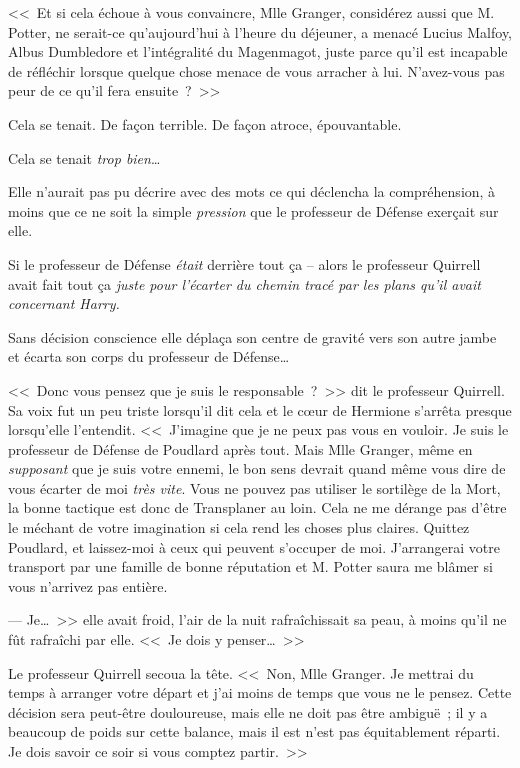 <<~Et si cela échoue à vous convaincre, Mlle Granger, considérez aussi que M. Potter, ne serait-ce qu'aujourd'hui à l'heure du déjeuner, a menacé Lucius Malfoy, Albus Dumbledore et l'intégralité du Magenmagot, juste parce qu'il est incapable de réfléchir lorsque quelque chose menace de vous arracher à lui. N'avez-vous pas peur de ce qu'il fera ensuite~?~>>

Cela se tenait. De façon terrible. De façon atroce, épouvantable.

Cela se tenait \emph{trop bien}…

Elle n'aurait pas pu décrire avec des mots ce qui déclencha la compréhension, à moins que ce ne soit la simple \emph{pression} que le professeur de Défense exerçait sur elle.

Si le professeur de Défense \emph{était} derrière tout ça -- alors le professeur Quirrell avait fait tout ça \emph{juste pour l'écarter du chemin tracé par les plans qu'il avait concernant Harry.}

Sans décision conscience elle déplaça son centre de gravité vers son autre jambe et écarta son corps du professeur de Défense…

<<~Donc vous pensez que je suis le responsable~?~>> dit le professeur Quirrell. Sa voix fut un peu triste lorsqu'il dit cela et le cœur de Hermione s'arrêta presque lorsqu'elle l'entendit. <<~J'imagine que je ne peux pas vous en vouloir. Je suis le professeur de Défense de Poudlard après tout. Mais Mlle Granger, même en \emph{supposant} que je suis votre ennemi, le bon sens devrait quand même vous dire de vous écarter de moi \emph{très vite}. Vous ne pouvez pas utiliser le sortilège de la Mort, la bonne tactique est donc de Transplaner au loin. Cela ne me dérange pas d'être le méchant de votre imagination si cela rend les choses plus claires. Quittez Poudlard, et laissez-moi à ceux qui peuvent s'occuper de moi. J'arrangerai votre transport par une famille de bonne réputation et M. Potter saura me blâmer si vous n'arrivez pas entière.

--- Je…~>> elle avait froid, l'air de la nuit rafraîchissait sa peau, à moins qu'il ne fût rafraîchi par elle. <<~Je dois y penser…~>>

Le professeur Quirrell secoua la tête. <<~Non, Mlle Granger. Je mettrai du temps à arranger votre départ et j'ai moins de temps que vous ne le pensez. Cette décision sera peut-être douloureuse, mais elle ne doit pas être ambiguë~; il y a beaucoup de poids sur cette balance, mais il est n'est pas équitablement réparti. Je dois savoir ce soir si vous comptez partir.~>>

